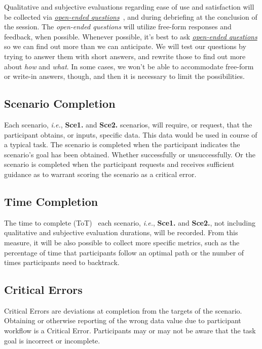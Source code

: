Qualitative and subjective evaluations regarding ease of use and satisfaction will be collected via {\it \hyperlink{https://www.nngroup.com/articles/open-ended-questions/}{open-ended questions}}~\cite{abelson2016supporting, merchant2018digital}, and during debriefing at the conclusion of the session.  The {\it open-ended questions} will utilize free-form responses and feedback, when possible. Whenever possible, it's best to ask {\it \hyperlink{https://www.nngroup.com/articles/open-ended-questions/}{open-ended questions}} so we can find out more than we can anticipate. We will test our questions by trying to answer them with short answers, and rewrite those to find out more about {\it how} and {\it what}. In some cases, we won't be able to accommodate free-form or write-in answers, though, and then it is necessary to limit the possibilities.

\subsection{Scenario Completion}

Each scenario, {\it i.e.}, {\bf Sce1.} and {\bf Sce2.} scenarios, will require, or request, that the participant obtains, or inputs, specific data. This data would be used in course of a typical task. The scenario is completed when the participant indicates the scenario's goal has been obtained. Whether successfully or unsuccessfully. Or the scenario is completed when the participant requests and receives sufficient guidance as to warrant scoring the scenario as a critical error.

\subsection{Time Completion}

The time to complete (ToT)~\cite{delgado2017time, huang2018impact} each scenario, {\it i.e.}, {\bf Sce1.} and {\bf Sce2.}, not including qualitative and subjective evaluation durations, will be recorded. From this measure, it will be also possible to collect more specific metrics, such as the percentage of time that participants follow an optimal path or the number of times participants need to backtrack.

\subsection{Critical Errors}

Critical Errors are deviations at completion from the targets of the scenario. Obtaining or otherwise reporting of the wrong data value due to participant workflow is a Critical Error. Participants may or may not be aware that the task goal is incorrect or incomplete.

